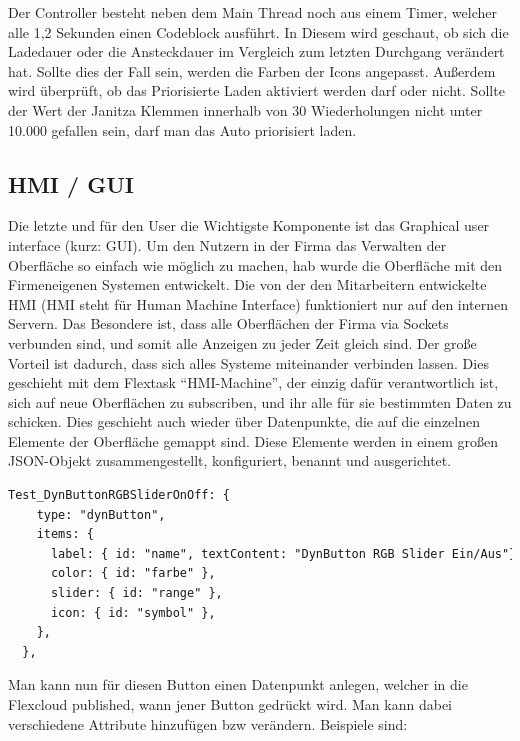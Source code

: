 Der Controller besteht neben dem Main Thread noch aus einem Timer, welcher alle 1,2 Sekunden einen Codeblock ausführt. In Diesem wird geschaut, ob sich die Ladedauer oder die Ansteckdauer im Vergleich zum letzten Durchgang verändert hat. Sollte dies der Fall sein, werden die Farben der Icons angepasst. Außerdem wird überprüft, ob das Priorisierte Laden aktiviert werden darf oder nicht. Sollte der Wert der Janitza Klemmen innerhalb von 30 Wiederholungen nicht unter 10.000 gefallen sein, darf man das Auto priorisiert laden.  

\subsection*{HMI / GUI}
Die letzte und für den User die Wichtigste Komponente ist das Graphical user interface (kurz: GUI). Um den Nutzern in der Firma das Verwalten der Oberfläche so einfach wie möglich zu machen, hab wurde die Oberfläche mit den Firmeneigenen Systemen entwickelt. Die von der den Mitarbeitern entwickelte HMI (HMI steht für Human Machine Interface) funktioniert nur auf den internen Servern. Das Besondere ist, dass alle Oberflächen der Firma via Sockets verbunden sind, und somit alle Anzeigen zu jeder Zeit gleich sind. Der große Vorteil ist dadurch, dass sich alles Systeme miteinander verbinden lassen. Dies geschieht mit dem Flextask “HMI-Machine”, der einzig dafür verantwortlich ist, sich auf neue Oberflächen zu subscriben, und ihr alle für sie bestimmten Daten zu schicken. Dies geschieht auch wieder über Datenpunkte, die auf die einzelnen Elemente der Oberfläche gemappt sind. Diese Elemente werden in einem großen JSON-Objekt zusammengestellt, konfiguriert, benannt und ausgerichtet.  

\begin{lstlisting}[language=HTML,caption=Example Element,label=lst:impl:foo]
  Test_DynButtonRGBSliderOnOff: { 
    type: "dynButton", 
    items: { 
      label: { id: "name", textContent: "DynButton RGB Slider Ein/Aus"}, 
      color: { id: "farbe" }, 
      slider: { id: "range" }, 
      icon: { id: "symbol" }, 
    }, 
  }, 
\end{lstlisting}
Man kann nun für diesen Button einen Datenpunkt anlegen, welcher in die Flexcloud published, wann jener Button gedrückt wird. Man kann dabei verschiedene Attribute hinzufügen bzw verändern. Beispiele sind: 

